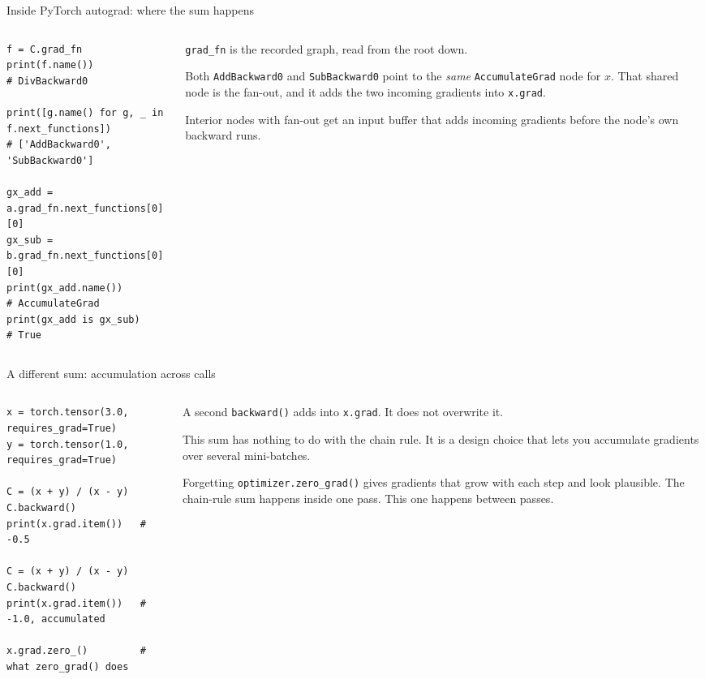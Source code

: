 \documentclass[aspectratio=169,xcolor=dvipsnames,svgnames,x11names,fleqn]{beamer}
\begin{document}
\begin{frame}[fragile]{Inside PyTorch autograd: where the sum happens}
\begin{columns}[T]
\begin{column}{0.56\textwidth}
\begin{lstlisting}[style=adpython]
f = C.grad_fn
print(f.name())
# DivBackward0

print([g.name() for g, _ in f.next_functions])
# ['AddBackward0', 'SubBackward0']

gx_add = a.grad_fn.next_functions[0][0]
gx_sub = b.grad_fn.next_functions[0][0]
print(gx_add.name())       # AccumulateGrad
print(gx_add is gx_sub)    # True
\end{lstlisting}
\end{column}
\begin{column}{0.42\textwidth}
\small
\texttt{grad\_fn} is the recorded graph, read from the root down.

\medskip
Both \texttt{AddBackward0} and \texttt{SubBackward0} point to the
\emph{same} \texttt{AccumulateGrad} node for $x$. That shared node is
the fan-out, and it adds the two incoming gradients into
\texttt{x.grad}.

\medskip
Interior nodes with fan-out get an input buffer that adds incoming
gradients before the node's own backward runs.
\end{column}
\end{columns}
\end{frame}

\begin{frame}[fragile]{A different sum: accumulation across calls}
\begin{columns}[T]
\begin{column}{0.56\textwidth}
\begin{lstlisting}[style=adpython]
x = torch.tensor(3.0, requires_grad=True)
y = torch.tensor(1.0, requires_grad=True)

C = (x + y) / (x - y)
C.backward()
print(x.grad.item())   # -0.5

C = (x + y) / (x - y)
C.backward()
print(x.grad.item())   # -1.0, accumulated

x.grad.zero_()         # what zero_grad() does
\end{lstlisting}
\end{column}
\begin{column}{0.42\textwidth}
\small
A second \texttt{backward()} adds into \texttt{x.grad}. It does not
overwrite it.

\medskip
This sum has nothing to do with the chain rule. It is a design choice
that lets you accumulate gradients over several mini-batches.

\medskip
{\color{adAccent}Forgetting \texttt{optimizer.zero\_grad()} gives
gradients that grow with each step and look plausible.} The chain-rule
sum happens inside one pass. This one happens between passes.
\end{column}
\end{columns}
\end{frame}
\end{document}
